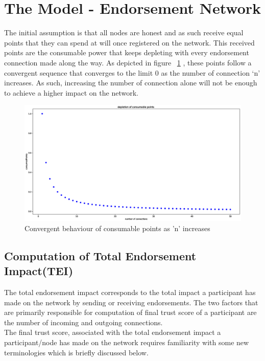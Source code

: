 \section{The Model - Endorsement Network}
The initial assumption is that all nodes are honest and as such receive equal
points that they can spend at will once registered on the network. This received
points are the consumable power that keeps depleting with every endorsement
connection made along the way. As depicted in figure ~\ref{consumablePoint} ,
these points follow a convergent sequence that converges to the limit 0 as the
number of connection `n' increases. As such, increasing the number of
connection alone will not be enough to achieve a higher impact on the network.
\begin{figure}
	\centering
	\includegraphics[width=1.0\textwidth]{Images/ConsumablePoints.eps}
	\caption{Convergent behaviour of consumable points as 'n' increases}
	\label{consumablePoint}
\end{figure}

\subsection{Computation of Total Endorsement Impact(TEI)} 
The total endorsement impact corresponds to the total impact a participant has
made on the network by sending or receiving endorsements. The two factors that
are primarily responsible for computation of final trust score of a participant
are the number of incoming and outgoing connections. \\

The final trust score, associated with the total endorsement impact a
participant/node has made on the network requires familiarity with some new
terminologies which is briefly discussed below. \\

